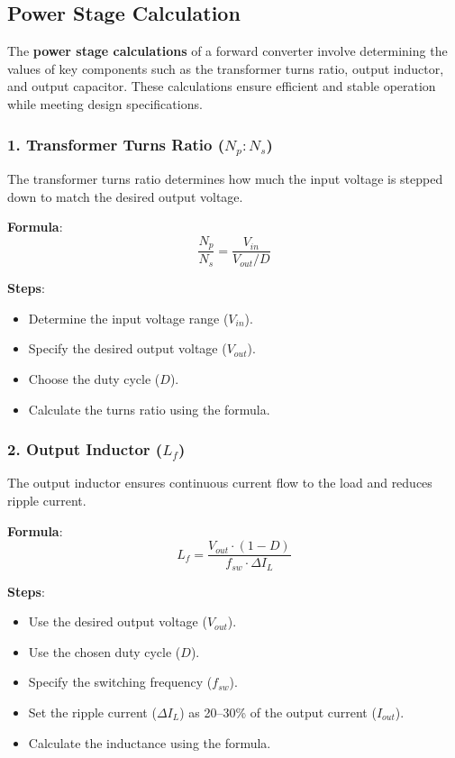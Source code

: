 \subsection{Power Stage Calculation}
The \textbf{power stage calculations} of a forward converter involve determining the values of key components such as the transformer turns ratio, output inductor, and output capacitor. These calculations ensure efficient and stable operation while meeting design specifications.

\subsubsection*{1. Transformer Turns Ratio ($ N_p : N_s $)}

The transformer turns ratio determines how much the input voltage is stepped down to match the desired output voltage.

\textbf{Formula}:
$$
\frac{N_p}{N_s} = \frac{V_{in}}{V_{out} / D}
$$

\textbf{Steps}:
\begin{itemize}
    \item Determine the input voltage range ($ V_{in} $).
    \item Specify the desired output voltage ($ V_{out} $).
    \item Choose the duty cycle ($ D $).
    \item Calculate the turns ratio using the formula.
\end{itemize}

\subsubsection*{2. Output Inductor ($ L_f $)}

The output inductor ensures continuous current flow to the load and reduces ripple current.

\textbf{Formula}:
$$
L_f = \frac{V_{out} \cdot (1 - D)}{f_{sw} \cdot \Delta I_L}
$$

\textbf{Steps}:
\begin{itemize}
   \item Use the desired output voltage ($ V_{out} $).
    \item Use the chosen duty cycle ($ D $).
    \item Specify the switching frequency ($ f_{sw} $).
    \item Set the ripple current ($ \Delta I_L $) as 20–30\% of the output current ($ I_{out} $).
    \item Calculate the inductance using the formula.
\end{itemize}

